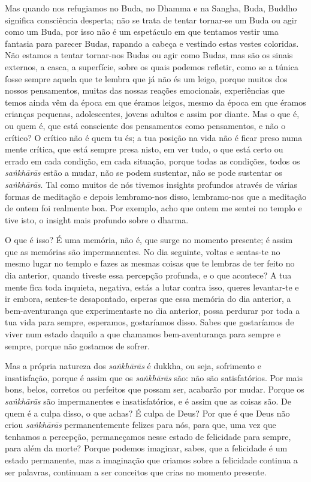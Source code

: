 Mas quando nos refugiamos no Buda, no Dhamma e na Sangha, Buda, Buddho significa
consciência desperta; não se trata de tentar tornar-se um Buda ou agir como um
Buda, por isso não é um espetáculo em que tentamos vestir uma fantasia para
parecer Budas, rapando a cabeça e vestindo estas vestes coloridas. Não estamos a
tentar tornar-nos Budas ou agir como Budas, mas são os sinais externos, a
casca, a superfície, sobre os quais podemos refletir, como se a túnica fosse
sempre aquela que te lembra que já não és um leigo, porque muitos dos nossos
pensamentos, muitas das nossas reações emocionais, experiências que temos ainda
vêm da época em que éramos leigos, mesmo da época em que éramos crianças
pequenas, adolescentes, jovens adultos e assim por diante. Mas o que é, ou quem
é, que está consciente dos pensamentos como pensamentos, e não o crítico? O
crítico não é quem tu és; a tua posição na vida não é ficar preso numa mente
crítica, que está sempre presa nisto, em ver tudo, o que está certo ou errado em
cada condição, em cada situação, porque todas as condições, todos os \emph{saṅkhārās}
estão a mudar, não se podem sustentar, não se pode sustentar os \emph{saṅkhārās}. Tal
como muitos de nós tivemos insights profundos através de várias formas de
meditação e depois lembramo-nos disso, lembramo-nos que a meditação de ontem
foi realmente boa. Por exemplo, acho que ontem me sentei no templo e tive isto,
o insight mais profundo sobre o dharma.

O que é isso? É uma memória, não é, que surge no momento presente; é assim que
as memórias são impermanentes. No dia seguinte, voltas e sentas-te no mesmo
lugar no templo e fazes as mesmas coisas que te lembras de ter feito no dia
anterior, quando tiveste essa percepção profunda, e o que acontece? A tua mente
fica toda inquieta, negativa, estás a lutar contra isso, queres levantar-te e
ir embora, sentes-te desapontado, esperas que essa memória do dia anterior, a
bem-aventurança que experimentaste no dia anterior, possa perdurar por toda a
tua vida para sempre, esperamos, gostaríamos disso. Sabes que gostaríamos de
viver num estado daquilo a que chamamos bem-aventurança para sempre e sempre,
porque não gostamos de sofrer.

Mas a própria natureza dos \emph{saṅkhārās} é dukkha, ou seja, sofrimento e
insatisfação, porque é assim que os \emph{saṅkhārās} são: não são satisfatórios. Por
mais bons, belos, corretos ou perfeitos que possam ser, acabarão por mudar.
Porque os \emph{saṅkhārās} são impermanentes e insatisfatórios, e é assim que as coisas
são. De quem é a culpa disso, o que achas? É culpa de Deus? Por que é que Deus
não criou \emph{saṅkhārās} permanentemente felizes para nós, para que, uma vez que
tenhamos a percepção, permaneçamos nesse estado de felicidade para sempre, para
além da morte? Porque podemos imaginar, sabes, que a felicidade é um estado
permanente, mas a imaginação que criamos sobre a felicidade continua a ser
palavras, continuam a ser conceitos que crias no momento presente.

